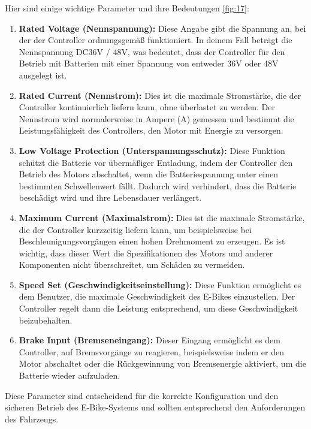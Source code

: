 Hier sind einige wichtige Parameter und ihre Bedeutungen \ref{fig:17}:

\begin{enumerate}
  \item \textbf{Rated Voltage (Nennspannung):} Diese Angabe gibt die Spannung an, bei der der Controller ordnungsgemäß funktioniert. In deinem Fall beträgt die Nennspannung DC36V / 48V, was bedeutet, dass der Controller für den Betrieb mit Batterien mit einer Spannung von entweder 36V oder 48V ausgelegt ist.
  
  \item \textbf{Rated Current (Nennstrom):} Dies ist die maximale Stromstärke, die der Controller kontinuierlich liefern kann, ohne überlastet zu werden. Der Nennstrom wird normalerweise in Ampere (A) gemessen und bestimmt die Leistungsfähigkeit des Controllers, den Motor mit Energie zu versorgen.
  
  \item \textbf{Low Voltage Protection (Unterspannungsschutz):} Diese Funktion schützt die Batterie vor übermäßiger Entladung, indem der Controller den Betrieb des Motors abschaltet, wenn die Batteriespannung unter einen bestimmten Schwellenwert fällt. Dadurch wird verhindert, dass die Batterie beschädigt wird und ihre Lebensdauer verlängert.
  
  \item \textbf{Maximum Current (Maximalstrom):} Dies ist die maximale Stromstärke, die der Controller kurzzeitig liefern kann, um beispielsweise bei Beschleunigungsvorgängen einen hohen Drehmoment zu erzeugen. Es ist wichtig, dass dieser Wert die Spezifikationen des Motors und anderer Komponenten nicht überschreitet, um Schäden zu vermeiden.
  
  \item \textbf{Speed Set (Geschwindigkeitseinstellung):} Diese Funktion ermöglicht es dem Benutzer, die maximale Geschwindigkeit des E-Bikes einzustellen. Der Controller regelt dann die Leistung entsprechend, um diese Geschwindigkeit beizubehalten.
  
  \item \textbf{Brake Input (Bremseneingang):} Dieser Eingang ermöglicht es dem Controller, auf Bremsvorgänge zu reagieren, beispielsweise indem er den Motor abschaltet oder die Rückgewinnung von Bremsenergie aktiviert, um die Batterie wieder aufzuladen.
\end{enumerate}

Diese Parameter sind entscheidend für die korrekte Konfiguration und den sicheren Betrieb des E-Bike-Systems und sollten entsprechend den Anforderungen des Fahrzeugs.

